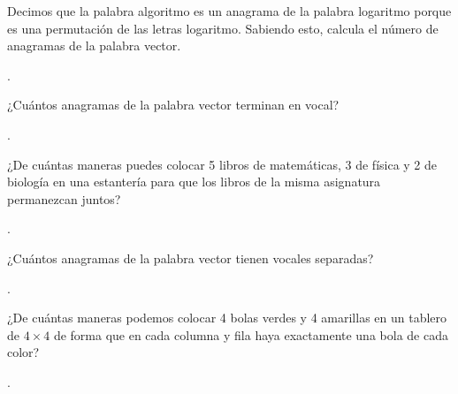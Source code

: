 \documentclass[11pt]{scrartcl}
\begin{document}
\begin{problem}
Decimos que la palabra algoritmo es un anagrama de la palabra logaritmo porque es una permutación de las letras logaritmo. Sabiendo esto, calcula el número de anagramas de la palabra vector.
\begin{hint}
    .
\end{hint}
\end{problem}

\begin{problem}
¿Cuántos anagramas de la palabra vector terminan en vocal?
\begin{hint}
    .
\end{hint}
\end{problem}

\begin{problem}
¿De cuántas maneras puedes colocar 5 libros de matemáticas, 3 de física y 2 de biología en una estantería para que los libros de la misma asignatura permanezcan juntos?
\begin{hint}
    .
\end{hint}
\end{problem}

\begin{problem}
¿Cuántos anagramas de la palabra vector tienen vocales separadas?
\begin{hint}
    .
\end{hint}
\end{problem}

\begin{problem}
¿De cuántas maneras podemos colocar 4 bolas verdes y 4 amarillas en un tablero de \(4 \times 4\) de forma que en cada columna y fila haya exactamente una bola de cada color?
\begin{hint}
    .
\end{hint}
\end{problem}
\end{document}
